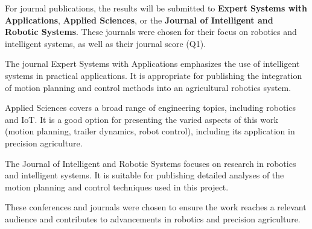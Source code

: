 For journal publications, the results will be submitted to \textbf{Expert Systems with Applications}, \textbf{Applied Sciences}, 
or the \textbf{Journal of Intelligent and Robotic Systems}. These journals were chosen for their focus on robotics and intelligent systems, as 
well as their journal score (Q1).

The journal Expert Systems with Applications emphasizes the use of intelligent systems in practical applications. 
It is appropriate for publishing the integration of motion planning and control methods into an agricultural robotics system.

Applied Sciences covers a broad range of engineering topics, including robotics and IoT. It is a good option 
for presenting the varied aspects of this work (motion planning, trailer dynamics, robot control), including its application in precision 
agriculture.

The Journal of Intelligent and Robotic Systems focuses on research in robotics and intelligent systems. It is suitable 
for publishing detailed analyses of the motion planning and control techniques used in this project.

These conferences and journals were chosen to ensure the work reaches a relevant audience and contributes to advancements 
in robotics and precision agriculture.
